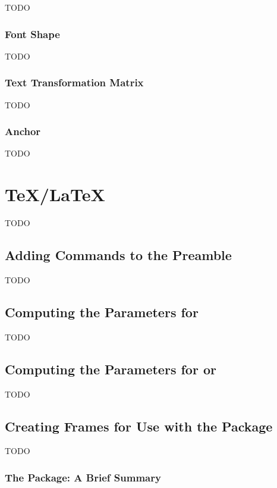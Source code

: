 TODO


\subsection{Font Shape}\label{sec:fontshape}

TODO


\subsection{Text Transformation Matrix}\label{sec:textmatrix}

TODO


\subsection{Anchor}\label{sec:fontanchor}

TODO


\chapter{\TeX/\LaTeX}\label{sec:tex}

TODO


\section{Adding Commands to the Preamble}\label{sec:setpreamble}

TODO


\section{Computing the Parameters for }\label{sec:parshape}

TODO


\section{Computing the Parameters for  or
}
\label{sec:shapepar}

TODO


\section{Creating Frames for Use with the  Package}
\label{sec:flowframe}

TODO


\subsection{The  Package: A Brief Summary}
\label{sec:flowframesummary}

